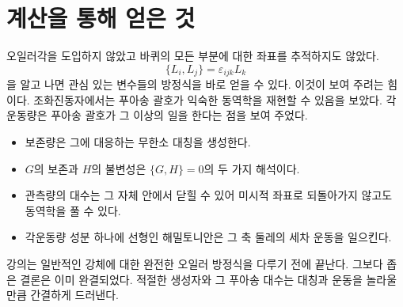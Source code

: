 \section{계산을 통해 얻은 것}

오일러각을 도입하지 않았고 바퀴의 모든 부분에 대한 좌표를 추적하지도 않았다. \[
  \{L_i,L_j\}=\varepsilon_{ijk}L_k
\]을 알고 나면 관심 있는 변수들의 방정식을 바로 얻을 수 있다. 이것이 보여 주려는 힘이다. 조화진동자에서는 푸아송 괄호가 익숙한 동역학을 재현할 수 있음을 보았다. 각운동량은 푸아송 괄호가 그 이상의 일을 한다는 점을 보여 주었다. \begin{itemize}\item 보존량은 그에 대응하는 무한소 대칭을 생성한다. \item \(G\)의 보존과 \(H\)의 불변성은 \(\{G,H\}=0\)의 두 가지 해석이다. \item 관측량의 대수는 그 자체 안에서 닫힐 수 있어 미시적 좌표로 되돌아가지 않고도 동역학을 풀 수 있다. \item 각운동량 성분 하나에 선형인 해밀토니안은 그 축 둘레의 세차 운동을 일으킨다.\end{itemize}강의는 일반적인 강체에 대한 완전한 오일러 방정식을 다루기 전에 끝난다. 그보다 좁은 결론은 이미 완결되었다. 적절한 생성자와 그 푸아송 대수는 대칭과 운동을 놀라울 만큼 간결하게 드러낸다.
